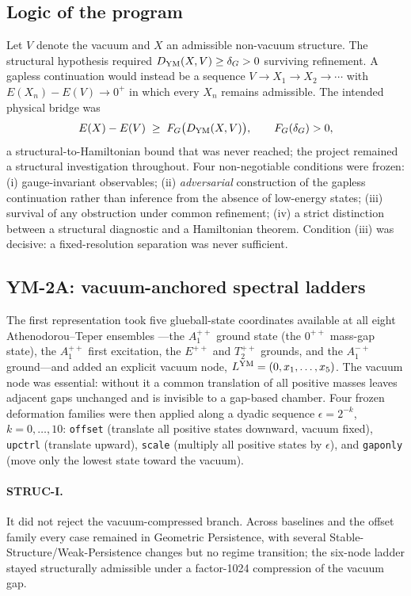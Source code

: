 \documentclass[11pt,a4paper]{article}
\theoremstyle{definition}
\theoremstyle{remark}
\begin{document}
\subsection{Logic of the program}
Let $V$ denote the vacuum and $X$ an admissible non-vacuum structure. The structural hypothesis required $D_{\rm YM}(X,V)\ge\delta_G>0$ surviving refinement. A gapless continuation would instead be a sequence $V\to X_1\to X_2\to\cdots$ with $E(X_n)-E(V)\to0^+$ in which every $X_n$ remains admissible. The intended physical bridge was
\begin{equation}
E(X)-E(V)\;\ge\;F_G\big(D_{\rm YM}(X,V)\big),\qquad F_G(\delta_G)>0,
\end{equation}
a structural-to-Hamiltonian bound that was never reached; the project remained a structural investigation throughout. Four non-negotiable conditions were frozen: (i) gauge-invariant observables; (ii) \emph{adversarial} construction of the gapless continuation rather than inference from the absence of low-energy states; (iii) survival of any obstruction under common refinement; (iv) a strict distinction between a structural diagnostic and a Hamiltonian theorem. Condition (iii) was decisive: a fixed-resolution separation was never sufficient.

\subsection{YM-2A: vacuum-anchored spectral ladders}\label{ssec:ym2a}
The first representation took five glueball-state coordinates available at all eight Athenodorou--Teper ensembles \cite{AT20}---the $A_1^{++}$ ground state (the $0^{++}$ mass-gap state), the $A_1^{++}$ first excitation, the $E^{++}$ and $T_2^{++}$ grounds, and the $A_1^{-+}$ ground---and added an explicit vacuum node, $L^{\rm YM}=(0,x_1,\dots,x_5)$. The vacuum node was essential: without it a common translation of all positive masses leaves adjacent gaps unchanged and is invisible to a gap-based chamber. Four frozen deformation families were then applied along a dyadic sequence $\epsilon=2^{-k}$, $k=0,\dots,10$: \texttt{offset} (translate all positive states downward, vacuum fixed), \texttt{upctrl} (translate upward), \texttt{scale} (multiply all positive states by $\epsilon$), and \texttt{gaponly} (move only the lowest state toward the vacuum).

\paragraph{STRUC-I.} It did not reject the vacuum-compressed branch. Across baselines and the offset family every case remained in Geometric Persistence, with several Stable-Structure/Weak-Persistence changes but no regime transition; the six-node ladder stayed structurally admissible under a factor-1024 compression of the vacuum gap.
\end{document}
